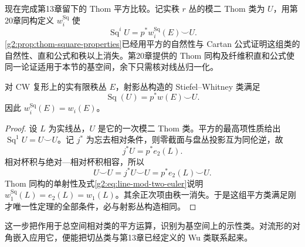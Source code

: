 \ProseParagraphBreak

现在完成第13章留下的 Thom 平方比较。记实秩 \(r\) 丛的模二 Thom 类为 \(U\)，用第20章同构定义 \(w_i^{\mathrm{Sq}}\) 使
\[
	\operatorname{Sq}^iU=p^*w_i^{\mathrm{Sq}}(E)\smile U.
\]
\cref{g2:prop:thom-square-properties}已经用平方的自然性与 Cartan 公式证明这组类的自然性、直和公式和秩以上消失。第20章提供的 Thom 同构及纤维积直和公式使同一论证适用于本节的基空间，余下只需核对线丛归一化。

\begin{theorem}\label{g2:thm:thom-square-comparison}
	对 CW 复形上的实有限秩丛 \(E\)，射影丛构造的 Stiefel--Whitney 类满足
	\begin{equation}\label{g2:eq:thom-sw-identity-proved}
		\operatorname{Sq}(U)=p^*w(E)\smile U.
	\end{equation}
	因此 \(w_i^{\mathrm{Sq}}(E)=w_i(E)\)。
\end{theorem}
\begin{proof}
	设 \(L\) 为实线丛，\(U\) 是它的一次模二 Thom 类。平方的最高项性质给出 \(\operatorname{Sq}^1U=U\smile U\)。记 \(j^*\) 为忘去相对条件，则零截面与盘丛投影互为同伦逆，故
	\[
		j^*U=p^*e_2(L).
	\]
	相对杯积与绝对—相对杯积相容，所以
	\[
		U\smile U=j^*U\smile U=p^*e_2(L)\smile U.
	\]
	Thom 同构的单射性及式\eqref{g2:eq:line-mod-two-euler}说明 \(w_1^{\mathrm{Sq}}(L)=e_2(L)=w_1(L)\)。其余正次项由秩一消失。于是这组平方类满足刚才唯一性定理的全部条件，必与射影丛构造相同。
\end{proof}

这一步把作用于总空间相对类的平方运算，识别为基空间上的示性类。对流形的对角嵌入应用它，便能把切丛类与第13章已经定义的 Wu 类联系起来。

